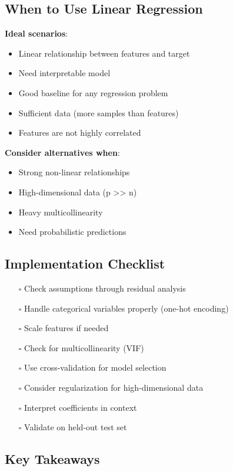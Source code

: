 \documentclass{article}
\begin{document}
\subsection{When to Use Linear Regression}

\textbf{Ideal scenarios}:
\begin{itemize}
    \item Linear relationship between features and target
    \item Need interpretable model
    \item Good baseline for any regression problem
    \item Sufficient data (more samples than features)
    \item Features are not highly correlated
\end{itemize}

\textbf{Consider alternatives when}:
\begin{itemize}
    \item Strong non-linear relationships
    \item High-dimensional data (p >> n)
    \item Heavy multicollinearity
    \item Need probabilistic predictions
\end{itemize}

\subsection{Implementation Checklist}

\begin{itemize}
    \item[$\square$] Check assumptions through residual analysis
    \item[$\square$] Handle categorical variables properly (one-hot encoding)
    \item[$\square$] Scale features if needed
    \item[$\square$] Check for multicollinearity (VIF)
    \item[$\square$] Use cross-validation for model selection
    \item[$\square$] Consider regularization for high-dimensional data
    \item[$\square$] Interpret coefficients in context
    \item[$\square$] Validate on held-out test set
\end{itemize}

\subsection{Key Takeaways}
\end{document}
